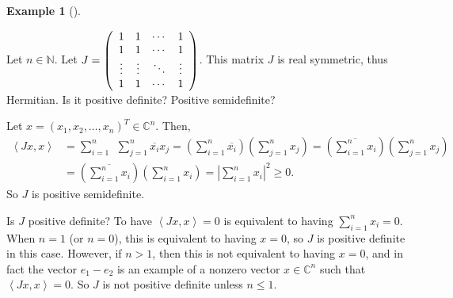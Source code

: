 \documentclass[numbers=enddot,12pt,final,onecolumn,notitlepage]{scrartcl}%
\numberwithin{exer}{subsection}
\theoremstyle{definition}
\newtheorem{exam}[theo]{Example}
\newenvironment{example}[1][]
{\begin{exam}[#1]\begin{leftbar}}
{\end{leftbar}\end{exam}}
\let\sumnonlimits\sum
\renewcommand{\sum}{\sumnonlimits\limits}
\begin{document}
\begin{example}
Let $n\in\mathbb{N}$. Let $J=\left(
\begin{array}
[c]{cccc}%
1 & 1 & \cdots & 1\\
1 & 1 & \cdots & 1\\
\vdots & \vdots & \ddots & \vdots\\
1 & 1 & \cdots & 1
\end{array}
\right)  $. This matrix $J$ is real symmetric, thus Hermitian. Is it positive
definite? Positive semidefinite?

Let $x=\left(  x_{1},x_{2},\ldots,x_{n}\right)  ^{T}\in\mathbb{C}^{n}$. Then,%
\begin{align*}
\left\langle Jx,x\right\rangle  &  =\sum_{i=1}^{n}\ \ \sum_{j=1}^{n}%
\overline{x_{i}}x_{j}=\left(  \sum_{i=1}^{n}\overline{x_{i}}\right)  \left(
\sum_{j=1}^{n}x_{j}\right)  =\left(  \overline{\sum_{i=1}^{n}x_{i}}\right)
\left(  \sum_{j=1}^{n}x_{j}\right) \\
&  =\left(  \overline{\sum_{i=1}^{n}x_{i}}\right)  \left(  \sum_{i=1}^{n}%
x_{i}\right)  =\left\vert \sum_{i=1}^{n}x_{i}\right\vert ^{2}\geq0.
\end{align*}
So $J$ is positive semidefinite.

Is $J$ positive definite? To have $\left\langle Jx,x\right\rangle =0$ is
equivalent to having $\sum_{i=1}^{n}x_{i}=0$. When $n=1$ (or $n=0$), this is
equivalent to having $x=0$, so $J$ is positive definite in this case. However,
if $n>1$, then this is not equivalent to having $x=0$, and in fact the vector
$e_{1}-e_{2}$ is an example of a nonzero vector $x\in\mathbb{C}^{n}$ such that
$\left\langle Jx,x\right\rangle =0$. So $J$ is not positive definite unless
$n\leq1$.
\end{example}
\end{document}
